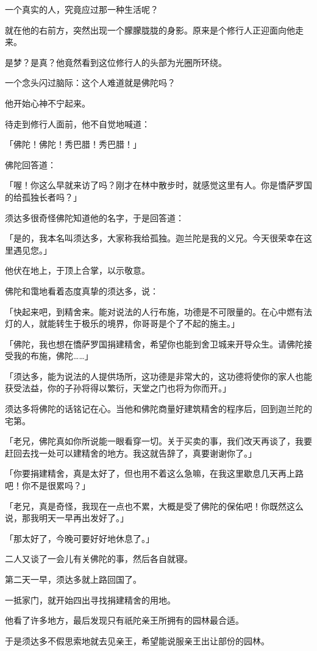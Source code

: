 \documentclass[twoside,openany]{book}
\begin{document}
一个真实的人，究竟应过那一种生活呢？

就在他的右前方，突然出现一个朦朦胧胧的身影。原来是个修行人正迎面向他走来。

是梦？是真？他竟然看到这位修行人的头部为光圈所环绕。

一个念头闪过脑际：这个人难道就是佛陀吗？

他开始心神不宁起来。

待走到修行人面前，他不自觉地喊道：

「佛陀！佛陀！秀巴腊！秀巴腊！」

佛陀回答道：

「喔！你这么早就来访了吗？刚才在林中散步时，就感觉这里有人。你是憍萨罗国的给孤独长者吗？」

须达多很奇怪佛陀知道他的名字，于是回答道：

「是的，我本名叫须达多，大家称我给孤独。迦兰陀是我的义兄。今天很荣幸在这里遇见您。」

他伏在地上，于顶上合掌，以示敬意。

佛陀和霭地看着态度真挚的须达多，说：

「快起来吧，到精舍来。能对说法的人行布施，功德是不可限量的。在心中燃有法灯的人，就能转生于极乐的境界，你哥哥是个了不起的施主。」

「佛陀，我也想在憍萨罗国捐建精舍，希望你也能到舍卫城来开导众生。请佛陀接受我的布施，佛陀……」

「须达多，能为说法的人提供场所，这功德是非常大的，这功德将使你的家人也能获受法益，你的子孙将得以繁衍，天堂之门也将为你而开。」

须达多将佛陀的话铭记在心。当他和佛陀商量好建筑精舍的程序后，回到迦兰陀的宅第。

「老兄，佛陀真如你所说能一眼看穿一切。关于买卖的事，我们改天再谈了，我要赶回去找一处可以建精舍的地方。我这就告辞了，真要谢谢你了。」

「你要捐建精舍，真是太好了，但也用不着这么急嘛，在我这里歇息几天再上路吧！你不是很累吗？」

「老兄，真是奇怪，我现在一点也不累，大概是受了佛陀的保佑吧！你既然这么说，那我明天一早再出发好了。」

「那太好了，今晚可要好好地休息了。」

二人又谈了一会儿有关佛陀的事，然后各自就寝。

第二天一早，须达多就上路回国了。

一抵家门，就开始四出寻找捐建精舍的用地。

他看了许多地方，最后发现只有祇陀亲王所拥有的园林最合适。

于是须达多不假思索地就去见亲王，希望能说服亲王出让部份的园林。
\end{document}
